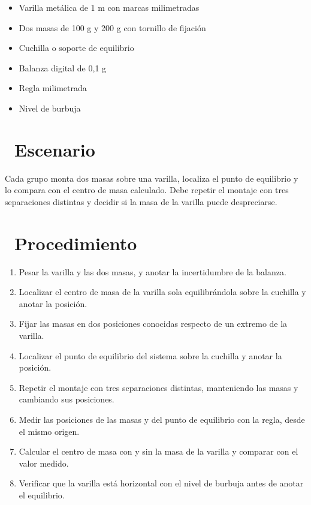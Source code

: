 \documentclass[11pt,a4paper]{article}
\newcommand{\iconotexto}[2]{\textcolor{cyanNeon}{\faIcon{#1}}~#2}
\begin{document}
\begin{itemize}[leftmargin=1.4em,itemsep=2pt,topsep=3pt]
  \item Varilla metálica de 1 m con marcas milimetradas
  \item Dos masas de 100 g y 200 g con tornillo de fijación
  \item Cuchilla o soporte de equilibrio
  \item Balanza digital de 0,1 g
  \item Regla milimetrada
  \item Nivel de burbuja
\end{itemize}

\section{\iconotexto{flask}{Escenario}}

Cada grupo monta dos masas sobre una varilla, localiza el punto de equilibrio y lo compara con el centro de masa calculado. Debe repetir el montaje con tres separaciones distintas y decidir si la masa de la varilla puede despreciarse.

\section{\iconotexto{list-ol}{Procedimiento}}

\begin{enumerate}[leftmargin=1.4em,itemsep=2pt,topsep=3pt]
  \item Pesar la varilla y las dos masas, y anotar la incertidumbre de la balanza.
  \item Localizar el centro de masa de la varilla sola equilibrándola sobre la cuchilla y anotar la posición.
  \item Fijar las masas en dos posiciones conocidas respecto de un extremo de la varilla.
  \item Localizar el punto de equilibrio del sistema sobre la cuchilla y anotar la posición.
  \item Repetir el montaje con tres separaciones distintas, manteniendo las masas y cambiando sus posiciones.
  \item Medir las posiciones de las masas y del punto de equilibrio con la regla, desde el mismo origen.
  \item Calcular el centro de masa con y sin la masa de la varilla y comparar con el valor medido.
  \item Verificar que la varilla está horizontal con el nivel de burbuja antes de anotar el equilibrio.
\end{enumerate}
\end{document}
